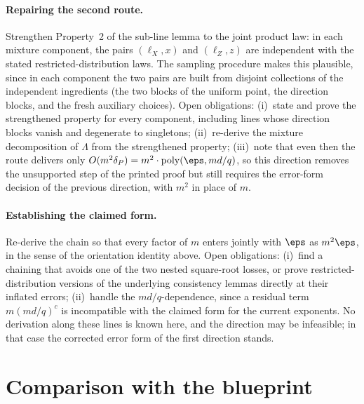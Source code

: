 \documentclass[11pt]{article}
\DeclareMathOperator{\poly}{poly}
\begin{document}
\paragraph{Repairing the second route.}
Strengthen Property~2 of the sub-line lemma to the joint product law: in
each mixture component, the pairs $(\ell_X, x)$ and $(\ell_Z, z)$ are
independent with the stated restricted-distribution laws.  The sampling
procedure makes this plausible, since in each component the two pairs
are built from disjoint collections of the independent ingredients (the
two blocks of the uniform point, the direction blocks, and the fresh
auxiliary choices).  Open obligations: (i)~state and prove the
strengthened property for every component, including lines whose
direction blocks vanish and degenerate to singletons; (ii)~re-derive the
mixture decomposition of $\Lambda$ from the strengthened property;
(iii)~note that even then the route delivers only
$O(m^2\delta_P) = m^2 \cdot \poly(\eps, md/q)$, so this direction removes
the unsupported step of the printed proof but still requires the
error-form decision of the previous direction, with $m^2$ in place of
$m$.

\paragraph{Establishing the claimed form.}
Re-derive the chain so that every factor of $m$ enters jointly with
$\eps$ as $m^2\eps$, in the sense of the orientation identity above.
Open obligations: (i)~find a chaining that avoids one of the two nested
square-root losses, or prove restricted-distribution versions of the
underlying consistency lemmas directly at their inflated errors;
(ii)~handle the $md/q$-dependence, since a residual term
$m (md/q)^{c}$ is incompatible with the claimed form for the current
exponents.  No derivation along these lines is known here, and the
direction may be infeasible; in that case the corrected error form of
the first direction stands.

\section{Comparison with the blueprint}
\end{document}
